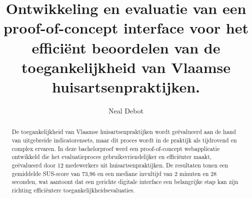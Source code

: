 \documentclass[a0,portrait]{hogent-poster}
\title{Ontwikkeling en evaluatie van een proof-of-concept interface voor het efficiënt beoordelen van de toegankelijkheid van Vlaamse huisartsenpraktijken.}
\author{Neal Debot}
\begin{document}
\maketitle

\begin{abstract}
De toegankelijkheid van Vlaamse huisartsenpraktijken wordt geëvalueerd aan de hand van uitgebreide indicatorensets, 
maar dit proces wordt in de praktijk als tijdrovend en complex ervaren. 
In deze bachelorproef werd een proof-of-concept webapplicatie ontwikkeld die het evaluatieproces gebruiksvriendelijker en efficiënter maakt, 
geëvalueerd door 12 medewerkers uit huisartsenpraktijken. 
De resultaten tonen een gemiddelde SUS-score van 73,96 en een mediane invultijd van 2 minuten en 28 seconden, 
wat aantoont dat een gerichte digitale interface een belangrijke stap kan zijn richting efficiëntere toegankelijkheidsevaluaties.
\end{abstract}
\end{document}
